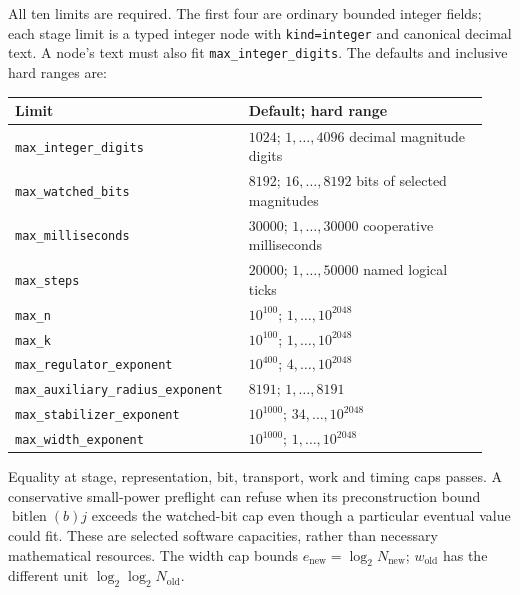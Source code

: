 All ten limits are required. The first four are ordinary bounded integer
fields; each stage limit is a typed integer node with
\texttt{kind=integer} and canonical decimal text. A node's text must also fit
\texttt{max\_integer\_digits}. The defaults and inclusive hard ranges are:
\begingroup
\small
\setlength{\parskip}{0pt}
\begin{longtable}{@{}p{0.46\linewidth}p{0.48\linewidth}@{}}
\toprule
Limit & Default; hard range \\
\midrule
\endhead
\texttt{max\_integer\_digits} & $1024$; $1,\ldots,4096$ decimal magnitude digits \\
\texttt{max\_watched\_bits} & $8192$; $16,\ldots,8192$ bits of selected magnitudes \\
\texttt{max\_milliseconds} & $30000$; $1,\ldots,30000$ cooperative milliseconds \\
\texttt{max\_steps} & $20000$; $1,\ldots,50000$ named logical ticks \\
\texttt{max\_n} & $10^{100}$; $1,\ldots,10^{2048}$ \\
\texttt{max\_k} & $10^{100}$; $1,\ldots,10^{2048}$ \\
\texttt{max\_regulator\_exponent} & $10^{400}$; $4,\ldots,10^{2048}$ \\
\texttt{max\_auxiliary\_radius\_exponent} & $8191$; $1,\ldots,8191$ \\
\texttt{max\_stabilizer\_exponent} & $10^{1000}$; $34,\ldots,10^{2048}$ \\
\texttt{max\_width\_exponent} & $10^{1000}$; $1,\ldots,10^{2048}$ \\
\bottomrule
\end{longtable}
\endgroup
Equality at stage, representation, bit, transport, work and timing caps
passes. A conservative small-power preflight can refuse when its
preconstruction bound $\operatorname{bitlen}(b)j$ exceeds the watched-bit
cap even though a particular eventual value could fit. These are selected
software capacities, rather than necessary mathematical resources.
The width cap bounds $e_{\mathrm{new}}=\log_2N_{\mathrm{new}}$;
$w_{\mathrm{old}}$ has the different unit $\log_2\log_2N_{\mathrm{old}}$.

